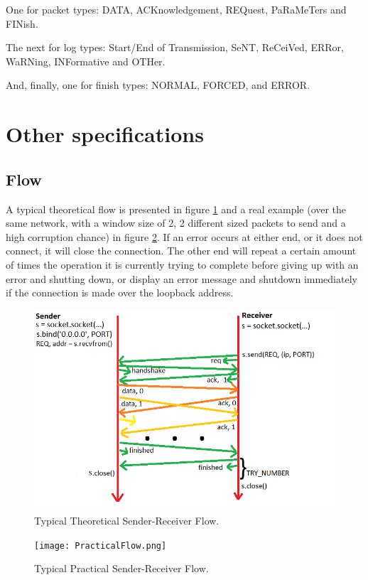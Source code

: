 \documentclass[12pt]{article}
\begin{document}
One for packet types: DATA, ACKnowledgement, REQuest, PaRaMeTers and FINish.

The next for log types: Start/End of Transmission, SeNT, ReCeiVed, ERRor, WaRNing, INFormative and OTHer.

And, finally, one for finish types: NORMAL, FORCED, and ERROR.

\section{Other specifications}

\subsection{Flow}

A typical theoretical flow is presented in figure \ref{fig:fig2} and a real example (over the same network, with a window size of 2, 2 different sized packets to send and a high corruption chance)  in figure \ref{fig:fig3}. If an error occurs at either end, or it does not connect, it will close the connection. The other end will repeat a certain amount of times the operation it is currently trying to complete before giving up with an error and shutting down, or display an error message and shutdown immediately if the connection is made over the loopback address.

\begin{figure}[!htb]
	\centering
	\includegraphics[width=\linewidth]{TheoreticalFlow.png}
	\caption{Typical Theoretical Sender-Receiver Flow.}\label{fig:fig2}
\end{figure}

\begin{figure}[!htb]
	\centering
	\texttt{[image: PracticalFlow.png]}
		\caption{Typical Practical Sender-Receiver Flow.}\label{fig:fig3}
\end{figure}
\end{document}
